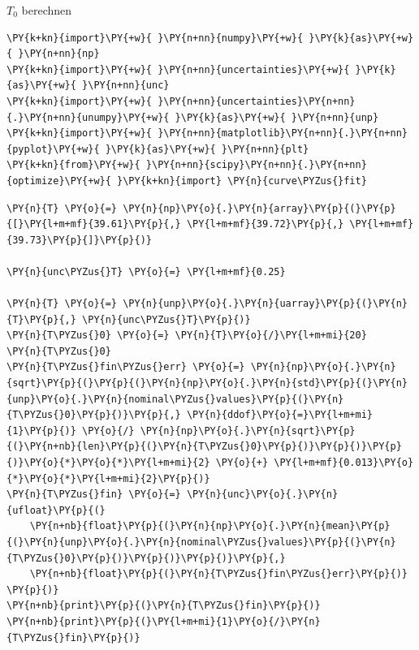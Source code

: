 

    
    \(T_0\) berechnen

    \begin{tcolorbox}[breakable, size=fbox, boxrule=1pt, pad at break*=1mm,colback=cellbackground, colframe=cellborder]
\begin{Verbatim}[commandchars=\\\{\}]
\PY{k+kn}{import}\PY{+w}{ }\PY{n+nn}{numpy}\PY{+w}{ }\PY{k}{as}\PY{+w}{ }\PY{n+nn}{np}
\PY{k+kn}{import}\PY{+w}{ }\PY{n+nn}{uncertainties}\PY{+w}{ }\PY{k}{as}\PY{+w}{ }\PY{n+nn}{unc}
\PY{k+kn}{import}\PY{+w}{ }\PY{n+nn}{uncertainties}\PY{n+nn}{.}\PY{n+nn}{unumpy}\PY{+w}{ }\PY{k}{as}\PY{+w}{ }\PY{n+nn}{unp}
\PY{k+kn}{import}\PY{+w}{ }\PY{n+nn}{matplotlib}\PY{n+nn}{.}\PY{n+nn}{pyplot}\PY{+w}{ }\PY{k}{as}\PY{+w}{ }\PY{n+nn}{plt}
\PY{k+kn}{from}\PY{+w}{ }\PY{n+nn}{scipy}\PY{n+nn}{.}\PY{n+nn}{optimize}\PY{+w}{ }\PY{k+kn}{import} \PY{n}{curve\PYZus{}fit}
\end{Verbatim}
\end{tcolorbox}

    \begin{tcolorbox}[breakable, size=fbox, boxrule=1pt, pad at break*=1mm,colback=cellbackground, colframe=cellborder]
\begin{Verbatim}[commandchars=\\\{\}]
\PY{n}{T} \PY{o}{=} \PY{n}{np}\PY{o}{.}\PY{n}{array}\PY{p}{(}\PY{p}{[}\PY{l+m+mf}{39.61}\PY{p}{,} \PY{l+m+mf}{39.72}\PY{p}{,} \PY{l+m+mf}{39.73}\PY{p}{]}\PY{p}{)}

\PY{n}{unc\PYZus{}T} \PY{o}{=} \PY{l+m+mf}{0.25}

\PY{n}{T} \PY{o}{=} \PY{n}{unp}\PY{o}{.}\PY{n}{uarray}\PY{p}{(}\PY{n}{T}\PY{p}{,} \PY{n}{unc\PYZus{}T}\PY{p}{)}
\PY{n}{T\PYZus{}0} \PY{o}{=} \PY{n}{T}\PY{o}{/}\PY{l+m+mi}{20}
\PY{n}{T\PYZus{}0}
\PY{n}{T\PYZus{}fin\PYZus{}err} \PY{o}{=} \PY{n}{np}\PY{o}{.}\PY{n}{sqrt}\PY{p}{(}\PY{p}{(}\PY{n}{np}\PY{o}{.}\PY{n}{std}\PY{p}{(}\PY{n}{unp}\PY{o}{.}\PY{n}{nominal\PYZus{}values}\PY{p}{(}\PY{n}{T\PYZus{}0}\PY{p}{)}\PY{p}{,} \PY{n}{ddof}\PY{o}{=}\PY{l+m+mi}{1}\PY{p}{)} \PY{o}{/} \PY{n}{np}\PY{o}{.}\PY{n}{sqrt}\PY{p}{(}\PY{n+nb}{len}\PY{p}{(}\PY{n}{T\PYZus{}0}\PY{p}{)}\PY{p}{)}\PY{p}{)}\PY{o}{*}\PY{o}{*}\PY{l+m+mi}{2} \PY{o}{+} \PY{l+m+mf}{0.013}\PY{o}{*}\PY{o}{*}\PY{l+m+mi}{2}\PY{p}{)}
\PY{n}{T\PYZus{}fin} \PY{o}{=} \PY{n}{unc}\PY{o}{.}\PY{n}{ufloat}\PY{p}{(}
    \PY{n+nb}{float}\PY{p}{(}\PY{n}{np}\PY{o}{.}\PY{n}{mean}\PY{p}{(}\PY{n}{unp}\PY{o}{.}\PY{n}{nominal\PYZus{}values}\PY{p}{(}\PY{n}{T\PYZus{}0}\PY{p}{)}\PY{p}{)}\PY{p}{)}\PY{p}{,}
    \PY{n+nb}{float}\PY{p}{(}\PY{n}{T\PYZus{}fin\PYZus{}err}\PY{p}{)}
\PY{p}{)}
\PY{n+nb}{print}\PY{p}{(}\PY{n}{T\PYZus{}fin}\PY{p}{)}
\PY{n+nb}{print}\PY{p}{(}\PY{l+m+mi}{1}\PY{o}{/}\PY{n}{T\PYZus{}fin}\PY{p}{)}
\end{Verbatim}
\end{tcolorbox}

